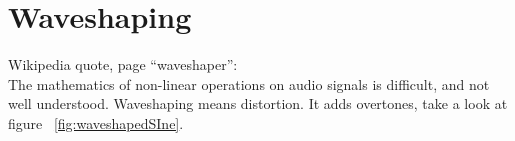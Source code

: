 










\section{Waveshaping}




Wikipedia quote, page ``waveshaper'':\\
\glqq{}The mathematics of non-linear operations on audio signals is difficult, and not well understood.\grqq{}
Waveshaping means distortion. It adds overtones, take a look at figure ~\ref{fig:waveshapedSIne}.


